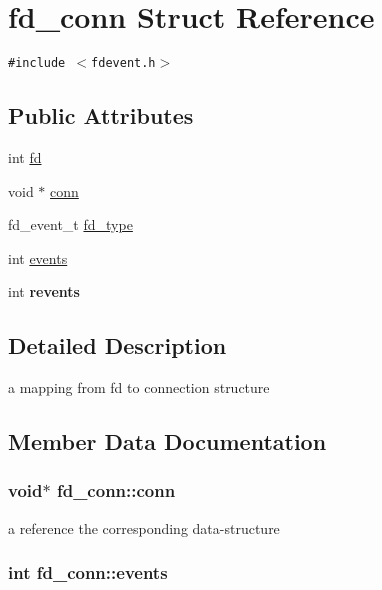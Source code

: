 \hypertarget{structfd__conn}{
\section{fd\_\-conn Struct Reference}
\label{structfd__conn}
}
{\tt \#include $<$fdevent.h$>$}

\subsection*{Public Attributes}
\begin{CompactItemize}
\item 
int \hyperlink{structfd__conn_576721c825a9faed73f007b6a9ed8d5f}{fd}
\item 
void $\ast$ \hyperlink{structfd__conn_def788a594e0605705bcba2b45f7d454}{conn}
\item 
fd\_\-event\_\-t \hyperlink{structfd__conn_17c1513ada1c24eddf52b5e4654452d5}{fd\_\-type}
\item 
int \hyperlink{structfd__conn_a83443abeee1a38a020988475e2ea768}{events}
\item 
\hypertarget{structfd__conn_d668589ad75f5957b1b860e5609856d5}{
int \textbf{revents}}
\label{structfd__conn_d668589ad75f5957b1b860e5609856d5}

\end{CompactItemize}


\subsection{Detailed Description}
a mapping from fd to connection structure 

\subsection{Member Data Documentation}
\hypertarget{structfd__conn_def788a594e0605705bcba2b45f7d454}{
\subsubsection[{conn}]{\setlength{\rightskip}{0pt plus 5cm}void$\ast$ {\bf fd\_\-conn::conn}}}
\label{structfd__conn_def788a594e0605705bcba2b45f7d454}


a reference the corresponding data-structure \hypertarget{structfd__conn_a83443abeee1a38a020988475e2ea768}{
\subsubsection[{events}]{\setlength{\rightskip}{0pt plus 5cm}int {\bf fd\_\-conn::events}}}
\label{structfd__conn_a83443abeee1a38a020988475e2ea768}


